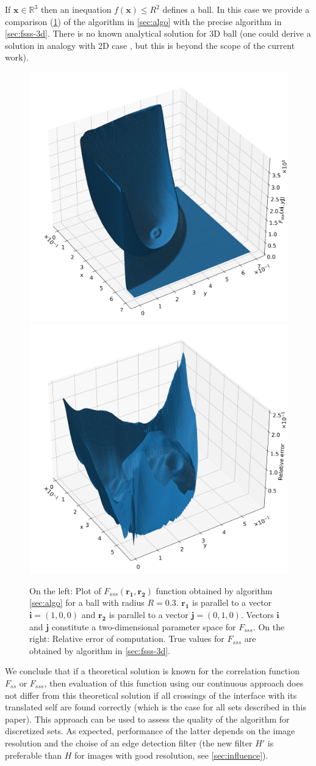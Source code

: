 \documentclass[1p]{elsarticle}
\begin{document}
If $\bm{x} \in \mathbb{R}^3$ then an inequation $f(\bm{x}) \le R^2$ defines a
ball. In this case we provide a comparison (\cref{fig:fsss-ball}) of the
algorithm in \cref{sec:algo} with the precise algorithm in
\cref{sec:fsss-3d}. There is no known analytical solution for 3D ball (one could
derive a solution in analogy with 2D case \cite{Torquato_book}, but this is
beyond the scope of the current work).
\begin{figure}[!hpt]
  \centering
  \includegraphics[width=0.45\linewidth]{images/ball-sss.png}
  \hfill
  \includegraphics[width=0.45\linewidth]{images/ball-sss-error.png}
  \caption[]{On the left: Plot of $F_{sss}(\bm{r_1}, \bm{r_2})$ function
    obtained by algorithm \cref{sec:algo} for a ball with radius
    $R = 0.3$. $\bm{r_1}$ is parallel to a vector $\bm{i} = (1, 0, 0)$ and
    $\bm{r_2}$ is parallel to a vector $\bm{j} = (0, 1, 0)$. Vectors $\bm{i}$
    and $\bm{j}$ constitute a two-dimensional parameter space for $F_{sss}$. On
    the right: Relative error of computation. True values for $F_{sss}$ are
    obtained by algorithm in \cref{sec:fsss-3d}.}
  \label{fig:fsss-ball}
\end{figure}

We conclude that if a theoretical solution is known for the correlation function
$F_{ss}$ or $F_{sss}$, then evaluation of this function using our continuous
approach does not differ from this theoretical solution if all crossings of
the interface with its translated self are found correctly (which is the case
for all sets described in this paper). This approach can be used to assess the
quality of the algorithm for discretized sets. As expected, performance of the
latter depends on the image resolution and the choise of an edge detection
filter (the new filter $H'$ is preferable than $H$ for images with good
resolution, see \cref{sec:influence}).
\end{document}
